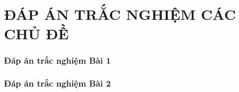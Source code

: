 \section{ĐÁP ÁN TRẮC NGHIỆM CÁC CHỦ ĐỀ}

\subsubsection{Đáp án trắc nghiệm Bài 1}
	
\subsubsection{Đáp án trắc nghiệm Bài 2}
	